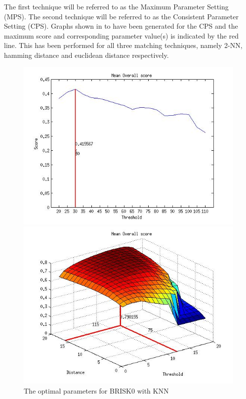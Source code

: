 \documentclass{article}
\begin{document}
The first technique will be referred to as the Maximum Parameter Setting (MPS). The second technique will be referred to as the Consistent Parameter Setting (CPS). Graphs shown in  to  have been generated for the CPS and the maximum score and corresponding parameter value(s) is indicated by the red line. This has been performed for all three matching techniques, namely 2-NN, hamming distance and euclidean distance respectively.\\


\begin{figure}
\begin{minipage}[b]{0.5\linewidth}
\includegraphics[scale=0.4]{../Drawings/OptimalParameters_SBRISK_SBRISK_KNN.jpg}
\caption{The optimal parameters for BRISK0 with KNN}
\label{fig:BRISK0knnOptimal}
\end{minipage}
\hspace{0.5cm}
\begin{minipage}[b]{0.5\linewidth}
\includegraphics[scale=0.4]{../Drawings/OptimalParameters_SBRISK_SBRISK_hamming.jpg}

\end{minipage}
\end{figure}
\end{document}
